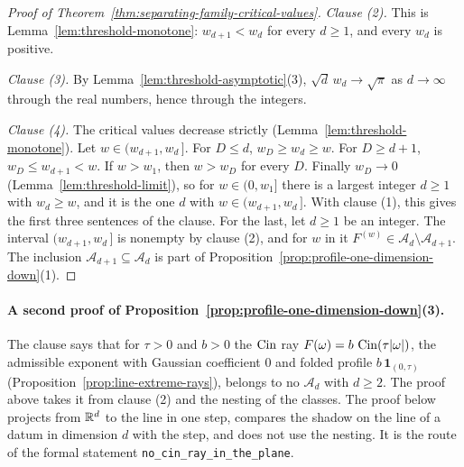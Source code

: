 \begin{proof}[Proof of Theorem~\ref{thm:separating-family-critical-values}]
\emph{Clause (2).} This is Lemma~\ref{lem:threshold-monotone}: $w_{d+1} < w_d$ for every $d \ge 1$,
and every $w_d$ is positive.

\emph{Clause (3).} By Lemma~\ref{lem:threshold-asymptotic}(3), $\sqrt d\,w_d \to \sqrt\pi$ as
$d \to \infty$ through the real numbers, hence through the integers.

\emph{Clause (4).} The critical values decrease strictly
(Lemma~\ref{lem:threshold-monotone}). Let $w \in (w_{d+1}, w_d\,]$. For $D \le d$,
$w_D \ge w_d \ge w$. For $D \ge d + 1$, $w_D \le w_{d+1} < w$. If $w > w_1$, then $w > w_D$ for
every $D$. Finally $w_D \to 0$ (Lemma~\ref{lem:threshold-limit}), so for $w \in (0,w_1]$ there is a
largest integer $d \ge 1$ with $w_d \ge w$, and it is the one $d$ with
$w \in (w_{d+1}, w_d\,]$.
With clause (1), this gives the first three sentences of the clause. For the last, let $d \ge 1$
be an integer. The interval $(w_{d+1}, w_d\,]$ is nonempty by clause (2), and for $w$ in it
$F^{(w)} \in \mathcal{A}_d \setminus \mathcal{A}_{d+1}$. The inclusion
$\mathcal{A}_{d+1} \subseteq \mathcal{A}_d$ is part of Proposition~\ref{prop:profile-one-dimension-down}(1).
\end{proof}

\paragraph{A second proof of Proposition~\ref{prop:profile-one-dimension-down}(3).} The clause
says that for $\tau > 0$ and $b > 0$ the $\operatorname{Cin}$ ray $F(\omega) = b\,\operatorname{Cin}(\tau|\omega|)$, the
admissible exponent with Gaussian coefficient $0$ and folded profile
$b\,\mathbf{1}_{(0,\tau)}$ (Proposition~\ref{prop:line-extreme-rays}), belongs to no
$\mathcal{A}_d$ with $d \ge 2$. The proof above takes it from clause (2) and the nesting of the
classes. The proof below projects from $\mathbb{R}^d$ to the line in one step, compares the shadow on
the line of a datum in dimension $d$ with the step, and does not use the nesting. It is the
route of the formal statement \texttt{no\_cin\_ray\_in\_the\_plane}.

